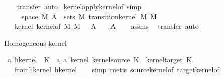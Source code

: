 \begin{isabellebody}
%
\isadelimproof
\ \ %
\endisadelimproof
%
\isatagproof
{}\isamarkupfalse%
\ {\isacharparenleft}{\kern0pt}transfer{\isacharcomma}{\kern0pt}\ auto{\isacharparenright}{\kern0pt}%
\endisatagproof
{\isafoldproof}%
%
\isadelimproof
\isanewline
%
\endisadelimproof
\isanewline
{}\isamarkupfalse%
\ kernel{\isacharunderscore}{\kern0pt}apply{\isacharunderscore}{\kern0pt}kernel{\isacharunderscore}{\kern0pt}of\ {\isacharbrackleft}{\kern0pt}simp{\isacharbrackright}{\kern0pt}{\isacharcolon}{\kern0pt}\isanewline
\ \ \ {\isachardoublequoteopen}{\isasymomega}\ {\isasymin}\ space\ M{\isachardoublequoteclose}\ {\isachardoublequoteopen}A{\isacharprime}{\kern0pt}\ {\isasymin}\ sets\ M{\isacharprime}{\kern0pt}{\isachardoublequoteclose}\ {\isachardoublequoteopen}transition{\isacharunderscore}{\kern0pt}kernel\ M\ M{\isacharprime}{\kern0pt}\ {\isasymkappa}{\isachardoublequoteclose}\isanewline
\ \ \ {\isachardoublequoteopen}kernel\ {\isacharparenleft}{\kern0pt}kernel{\isacharunderscore}{\kern0pt}of\ M\ M{\isacharprime}{\kern0pt}\ {\isasymkappa}{\isacharparenright}{\kern0pt}\ {\isasymomega}\ A{\isacharprime}{\kern0pt}\ {\isacharequal}{\kern0pt}\ {\isasymkappa}\ {\isasymomega}\ A{\isacharprime}{\kern0pt}{\isachardoublequoteclose}\isanewline
%
\isadelimproof
\ \ %
\endisadelimproof
%
\isatagproof
{}\isamarkupfalse%
\ assms\ \isamarkupfalse%
\ {\isacharparenleft}{\kern0pt}transfer{\isacharcomma}{\kern0pt}\ auto{\isacharparenright}{\kern0pt}%
\endisatagproof
{\isafoldproof}%
%
\isadelimproof
%
\endisadelimproof
%
\begin{isamarkuptext}%
Homogeneous kernel%
\end{isamarkuptext}\isamarkuptrue%
\isamarkupfalse%
\ {\isacharprime}{\kern0pt}a\ hkernel\ {\isacharequal}{\kern0pt}\ {\isachardoublequoteopen}{\isacharbraceleft}{\kern0pt}K\ {\isacharcolon}{\kern0pt}{\isacharcolon}{\kern0pt}\ {\isacharparenleft}{\kern0pt}{\isacharprime}{\kern0pt}a{\isacharcomma}{\kern0pt}\ {\isacharprime}{\kern0pt}a{\isacharparenright}{\kern0pt}\ kernel{\isachardot}{\kern0pt}\ kernel{\isacharunderscore}{\kern0pt}source\ K\ {\isacharequal}{\kern0pt}\ kernel{\isacharunderscore}{\kern0pt}target\ K{\isacharbraceright}{\kern0pt}{\isachardoublequoteclose}\isanewline
\ \ \ from{\isacharunderscore}{\kern0pt}hkernel\ hkernel\isanewline
%
\isadelimproof
\ \ %
\endisadelimproof
%
\isatagproof
{}\isamarkupfalse%
\ {\isacharparenleft}{\kern0pt}simp{\isacharcomma}{\kern0pt}\ metis\ source{\isacharunderscore}{\kern0pt}kernel{\isacharunderscore}{\kern0pt}of\ target{\isacharunderscore}{\kern0pt}kernel{\isacharunderscore}{\kern0pt}of{\isacharparenright}{\kern0pt}%

\end{isabellebody}
